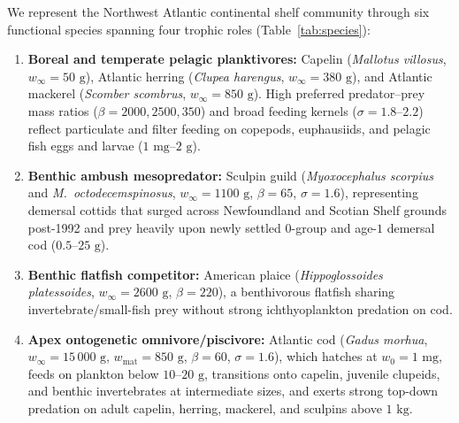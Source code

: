 \documentclass[11pt,letterpaper]{article}
\begin{document}
We represent the Northwest Atlantic continental shelf community through six functional species spanning four trophic roles (Table~\ref{tab:species}):
\begin{enumerate}
  \item \textbf{Boreal and temperate pelagic planktivores:} Capelin (\emph{Mallotus villosus}, $w_\infty = 50\text{ g}$), Atlantic herring (\emph{Clupea harengus}, $w_\infty = 380\text{ g}$), and Atlantic mackerel (\emph{Scomber scombrus}, $w_\infty = 850\text{ g}$). High preferred predator--prey mass ratios ($\beta = 2000, 2500, 350$) and broad feeding kernels ($\sigma = 1.8$--$2.2$) reflect particulate and filter feeding on copepods, euphausiids, and pelagic fish eggs and larvae ($1\text{ mg}$--$2\text{ g}$).
  \item \textbf{Benthic ambush mesopredator:} Sculpin guild (\emph{Myoxocephalus scorpius} and \emph{M.~octodecemspinosus}, $w_\infty = 1100\text{ g}$, $\beta = 65$, $\sigma = 1.6$), representing demersal cottids that surged across Newfoundland and Scotian Shelf grounds post-1992 and prey heavily upon newly settled $0$-group and age-$1$ demersal cod ($0.5$--$25\text{ g}$).
  \item \textbf{Benthic flatfish competitor:} American plaice (\emph{Hippoglossoides platessoides}, $w_\infty = 2600\text{ g}$, $\beta = 220$), a benthivorous flatfish sharing invertebrate/small-fish prey without strong ichthyoplankton predation on cod.
  \item \textbf{Apex ontogenetic omnivore/piscivore:} Atlantic cod (\emph{Gadus morhua}, $w_\infty = 15\,000\text{ g}$, $w_{\mathrm{mat}} = 850\text{ g}$, $\beta = 60$, $\sigma = 1.6$), which hatches at $w_0 = 1\text{ mg}$, feeds on plankton below $10$--$20\text{ g}$, transitions onto capelin, juvenile clupeids, and benthic invertebrates at intermediate sizes, and exerts strong top-down predation on adult capelin, herring, mackerel, and sculpins above $1\text{ kg}$.
\end{enumerate}
\end{document}

